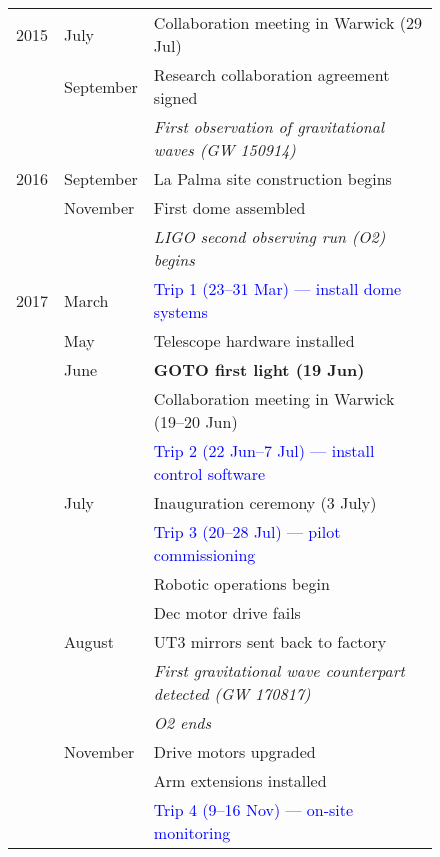 \begin{colsection}
\begin{colsection}
\begin{figure}[p]
    \begin{center}
        \begin{tabular}{cl|@{\tls}l} %
            2015 & July      & Collaboration meeting in Warwick (29 Jul) \\
                 & September & Research collaboration agreement signed \\
                 &           & \textit{First observation of gravitational waves (GW 150914)} \\
            \midrule
            2016 & September & La Palma site construction begins \\
                 & November  & First dome assembled \\
                 &           & \textit{LIGO second observing run (O2) begins} \\
            \midrule
            2017 & March     & \textcolor{Blue}{Trip 1 (23--31 Mar) --- install dome systems} \\
                 & May       & Telescope hardware installed \\
                 & June      & \textbf{GOTO first light (19 Jun)} \\
                 &           & Collaboration meeting in Warwick (19--20 Jun) \\
                 &           & \textcolor{Blue}{Trip 2 (22 Jun--7 Jul) --- install control software} \\
                 & July      & Inauguration ceremony (3 July) \\
                 &           & \textcolor{Blue}{Trip 3 (20--28 Jul) --- pilot commissioning} \\
                 &           & Robotic operations begin \\
                 &           & Dec motor drive fails \\
                 & August    & UT3 mirrors sent back to factory \\
                 &           & \textit{First gravitational wave counterpart detected (GW 170817)} \\
                 &           & \textit{O2 ends} \\
                 & November  & Drive motors upgraded \\
                 &           & Arm extensions installed \\
                 &           & \textcolor{Blue}{Trip 4 (9--16 Nov) --- on-site monitoring} \\

\end{tabular}
\end{center}
\end{figure}
\end{colsection}
\end{colsection}
